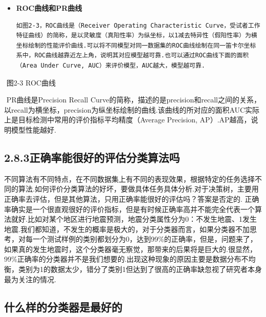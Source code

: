 \begin{itemize}
\item
  \textbf{ROC曲线和PR曲线}

\begin{verbatim}
如图2-3，ROC曲线是（Receiver Operating Characteristic Curve，受试者工作特征曲线）的简称，是以灵敏度（真阳性率）为纵坐标，以1减去特异性（假阳性率）为横坐标绘制的性能评价曲线.可以将不同模型对同一数据集的ROC曲线绘制在同一笛卡尔坐标系中，ROC曲线越靠近左上角，说明其对应模型越可靠.也可以通过ROC曲线下面的面积（Area Under Curve, AUC）来评价模型，AUC越大，模型越可靠.
\end{verbatim}
\end{itemize}

\begin{figure}
\centering
\caption{}
\end{figure}

​ 图2-3 ROC曲线

​ PR曲线是Precision Recall
Curve的简称，描述的是precision和recall之间的关系，以recall为横坐标，precision为纵坐标绘制的曲线.该曲线的所对应的面积AUC实际上是目标检测中常用的评价指标平均精度（Average
Precision, AP）.AP越高，说明模型性能越好.

\subsection{2.8.3正确率能很好的评估分类算法吗}\label{ux6b63ux786eux7387ux80fdux5f88ux597dux7684ux8bc4ux4f30ux5206ux7c7bux7b97ux6cd5ux5417}

​
不同算法有不同特点，在不同数据集上有不同的表现效果，根据特定的任务选择不同的算法.如何评价分类算法的好坏，要做具体任务具体分析.对于决策树，主要用正确率去评估，但是其他算法，只用正确率能很好的评估吗？
​ 答案是否定的. ​
正确率确实是一个很直观很好的评价指标，但是有时候正确率高并不能完全代表一个算法就好.比如对某个地区进行地震预测，地震分类属性分为0：不发生地震、1发生地震.我们都知道，不发生的概率是极大的，对于分类器而言，如果分类器不加思考，对每一个测试样例的类别都划分为0，达到99\%的正确率，但是，问题来了，如果真的发生地震时，这个分类器毫无察觉，那带来的后果将是巨大的.很显然，99\%正确率的分类器并不是我们想要的.出现这种现象的原因主要是数据分布不均衡，类别为1的数据太少，错分了类别1但达到了很高的正确率缺忽视了研究者本身最为关注的情况.

\subsection{什么样的分类器是最好的}\label{ux4ec0ux4e48ux6837ux7684ux5206ux7c7bux5668ux662fux6700ux597dux7684}

